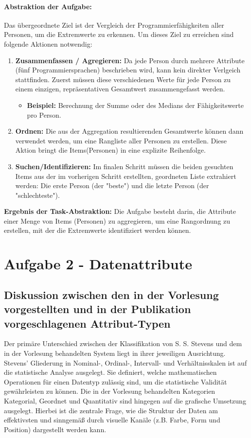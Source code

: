 \documentclass[12pt, a4paper]{article}
\begin{document}
\paragraph{Abstraktion der Aufgabe:}
Das übergeordnete Ziel ist der Vergleich der Programmierfähigkeiten aller Personen, um die Extremwerte zu erkennen. Um dieses Ziel zu erreichen sind folgende
Aktionen notwendig:
\begin{enumerate}
  \item \textbf{Zusammenfassen / Agregieren:}
    Da jede Person durch mehrere Attribute (fünf Programmiersprachen) beschrieben wird, kann kein direkter Verlgeich stattfinden. Zuerst müssen diese verschiedenen Werte
    für jede Person zu einem einzigen, repräsentativen Gesamtwert zusammengefasst werden.
      \begin{itemize}
        \item \textbf{Beispiel:} Berechnung der Summe oder des Medians der Fähigkeitswerte pro Person.
      \end{itemize}
  \item \textbf{Ordnen:} Die aus der Aggregation resultierenden Gesamtwerte können dann verwendet werden, um eine Rangliste aller Personen zu erstellen. Diese Aktion bringt
    die Items(Personen) in eine explizite Reihenfolge.
  \item \textbf{Suchen/Identifizieren:} Im finalen Schritt müssen die beiden gesuchten Items aus der im vorherigen Schritt erstellten, geordneten Liste extrahiert werden:
    Die erste Person (der "beste") und die letzte Person (der "schlechteste").
\end{enumerate}


\vspace{1em}
\textbf{Ergebnis der Task-Abstraktion:} Die Aufgabe besteht darin, die Attribute einer Menge von Items (Personen) zu aggregieren,
um eine Rangordnung zu erstellen, mit der die Extremwerte identifiziert werden können.



\section*{Aufgabe 2 - Datenattribute}
\subsection*{Diskussion zwischen den in der Vorlesung vorgestellten und in der Publikation vorgeschlagenen Attribut-Typen}

Der primäre Unterschied zwischen der Klassifikation von S. S. Stevens und dem in der Vorlesung behandelten System liegt in ihrer jeweiligen Ausrichtung.
Stevens' Gliederung in Nominal-, Ordinal-, Intervall- und Verhältnisskalen ist auf die statistische Analyse ausgelegt.
Sie definiert, welche mathematischen Operationen für einen Datentyp zulässig sind, um die statistische Validität gewährleisten zu können.
Die in der Vorlesung behandelten Kategorien Kategorial, Geordnet und Quantitativ sind hingegen auf die grafische Umsetzung ausgelegt. 
Hierbei ist die zentrale Frage, wie die Struktur der Daten am effektivsten und sinngemäß durch visuelle Kanäle (z.B. Farbe, Form und Position) dargestellt werden kann.
\end{document}
